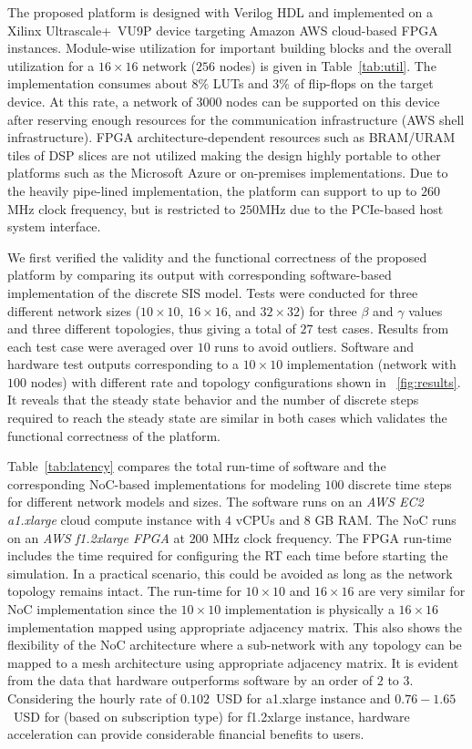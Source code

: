 The proposed platform is designed with Verilog HDL and implemented on a Xilinx Ultrascale+~VU9P device targeting Amazon AWS cloud-based FPGA instances.
Module-wise utilization for important building blocks and the overall utilization for a $16 \!\times 16$ network ($256$ nodes) is given in Table~\ref{tab:util}.
The implementation consumes about $8\%$ LUTs and $3\%$ of flip-flops on the target device.
At this rate, a network of $3000$ nodes can be supported on this device after reserving enough resources for the communication infrastructure (AWS shell infrastructure). 
FPGA architecture-dependent resources such as BRAM/URAM tiles of DSP slices are not utilized making the design highly portable to other platforms such as the Microsoft Azure or on-premises implementations.
Due to the heavily pipe-lined implementation, the platform can support to up to $260$MHz clock frequency, but is restricted to $250$MHz due to the PCIe-based host system interface.   

We first verified the validity and the functional correctness of the proposed platform by comparing its output with corresponding software-based implementation of the discrete SIS model.
Tests were conducted for three different network sizes ($10 \times 10$, $16 \times 16$, and $32 \times 32$) for three $\beta$ and $\gamma$ values and three different topologies, thus giving a total of $27$ test cases.
Results from each test case were averaged over $10$ runs to avoid outliers.
Software and hardware test outputs corresponding to a $10 \times 10$ implementation (network with $100$ nodes) with different rate and topology configurations shown in \figurename{~\ref{fig:results}}. It reveals that the steady state behavior and the number of discrete steps required to reach the steady state are similar in both cases which validates the functional correctness of the platform.

Table~\ref{tab:latency} compares the total run-time of software and the corresponding NoC-based implementations for modeling $100$ discrete time steps for different network models and sizes.
The software runs on an \emph{AWS EC2 a1.xlarge} cloud compute instance with $4$ vCPUs and $8$ GB RAM.
The NoC runs on an \emph{AWS f1.2xlarge FPGA} at $200$ MHz clock frequency.
The FPGA run-time includes the time required for configuring the RT each time before starting the simulation.
In a practical scenario, this could be avoided as long as the network topology remains intact.
The run-time for $10\times10$ and $16\times16$ are very similar for NoC implementation since the $10\times10$ implementation is physically a $16\times16$ implementation mapped using appropriate adjacency matrix.
This also shows the flexibility of the NoC architecture where a sub-network with any topology can be mapped to a mesh architecture using appropriate adjacency matrix. 
It is evident from the data that hardware outperforms software by an order of $2$ to $3$.
Considering the hourly rate of $0.102$~USD for a1.xlarge instance and $0.76-1.65$~USD for (based on subscription type) for f1.2xlarge instance, hardware acceleration can provide considerable financial benefits to users. 


